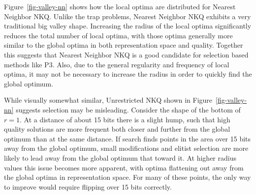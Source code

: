 \begin{figure*}
  \centering
  \caption{Location and quality of local optima in comparison to the global optima for a representative Nearest Neighbor NKQ problem
           with $N=60$ and $k=2$.}
  \label{fig-valley-nn}
\end{figure*}

Figure~\ref{fig-valley-nn} shows how the local optima are distributed for Nearest Neighbor NKQ. Unlike the trap problems,
Nearest Neighbor NKQ exhibits a very traditional big valley shape. Increasing the radius of the local optima significantly
reduces the total number of local optima, with those optima generally more similar to the global optima in both representation
space and quality. Together this suggests that Nearest Neighbor NKQ is a good candidate for selection based methods like P3. Also,
due to the general regularity and frequency of local optima, it may not be necessary to increase the radius in order to quickly find
the global optimum.

\begin{figure*}
  \centering
  \caption{Location and quality of local optima in comparison to the global optima for a representative Unrestricted NKQ problem
           with $N=60$ and $k=2$.}
  \label{fig-valley-un}
\end{figure*}

While visually somewhat similar, Unrestricted NKQ shown in Figure~\ref{fig-valley-nn} suggests selection may be misleading.
Consider the shape of the bottom of $r=1$. At a distance of about 15 bits there is a slight hump, such that high quality solutions
are more frequent both closer and further from the global optimum than at the same distance.
If search finds points in the area over 15 bits away from the global optimum, small modifications and elitist selection
are more likely to lead away from the global optimum that toward it.
At higher radius values this issue becomes more apparent, with optima flattening out away
from the global optima in representation space. For many of these points, the only way to improve would require flipping over 15 bits
correctly.

\begin{figure*}
  \centering
  \caption{Location and quality of local optima in comparison to the global optima for a representative Ising Spin Glass problem
           with $N=36$.}
  \label{fig-valley-is}
\end{figure*}

